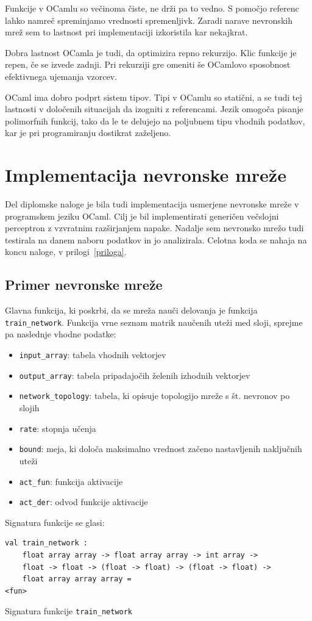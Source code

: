 \documentclass[mat1]{fmfdelo}
\begin{document}
Funkcije v OCamlu so večinoma čiste, ne drži pa to vedno. S pomočjo referenc lahko namreč spreminjamo vrednosti spremenljivk. Zaradi narave nevronskih mrež sem to lastnost pri implementaciji izkoristila kar nekajkrat.

Dobra lastnost OCamla je tudi, da optimizira repno rekurzijo. Klic funkcije je repen, če se izvede zadnji. Pri rekurziji gre omeniti še OCamlovo sposobnost efektivnega ujemanja vzorcev. 

OCaml ima dobro podprt sistem tipov. Tipi v OCamlu so statični, a se tudi tej lastnosti v določenih situacijah da izogniti z referencami. Jezik omogoča pisanje polimorfnih funkcij, tako da le te delujejo na poljubnem tipu vhodnih podatkov, kar je pri programiranju dostikrat zaželjeno. 
%
%
%
\section{Implementacija nevronske mreže}
Del diplomske naloge je bila tudi implementacija usmerjene nevronske mreže v programskem jeziku OCaml. Cilj je bil implementirati generičen večslojni perceptron z vzvratnim razširjanjem napake. Nadalje sem nevronsko mrežo tudi testirala na danem naboru podatkov in jo analizirala. Celotna koda se nahaja na koncu naloge, v prilogi~\ref{priloga}.
%
\subsection{Primer nevronske mreže}
Glavna funkcija, ki poskrbi, da se mreža nauči delovanja je funkcija  \texttt{train\_network}. Funkcija vrne seznam matrik naučenih uteži med sloji, sprejme pa naslednje vhodne podatke:
\begin{itemize}
	\item \texttt{input\_array}: tabela vhodnih vektorjev
	\item \texttt{output\_array}: tabela pripadajočih želenih izhodnih vektorjev
	\item \texttt{network\_topology}: tabela, ki opisuje topologijo mreže s št. nevronov po slojih 
	\item \texttt{rate}: stopnja učenja 
	\item \texttt{bound}: meja, ki določa maksimalno vrednost začeno nastavljenih naključnih uteži
	\item \texttt{act\_fun}: funkcija aktivacije
	\item \texttt{act\_der}: odvod funkcije aktivacije
\end{itemize}
%
Signatura funkcije se glasi:
%
\begin{listing}[!h]
	\begin{verbatim}
val train_network :
	float array array -> float array array -> int array -> 
	float -> float -> (float -> float) -> (float -> float) -> 
	float array array array =
<fun>
	\end{verbatim} 
	\caption{Signatura funkcije \texttt{train\_network}}
	\label{signatura}
\end{listing}
\end{document}
